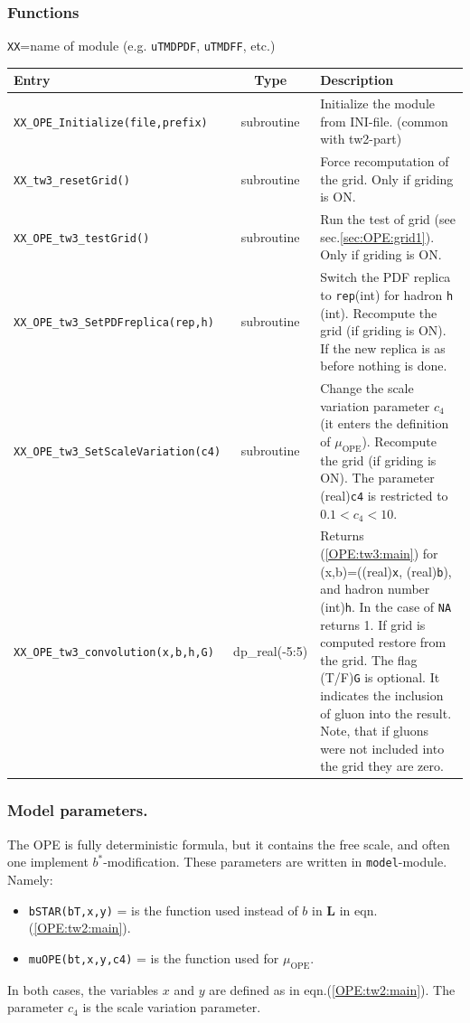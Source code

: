 \documentclass[prd,nofootinbib,eqsecnum,final]{revtex4}
\renewcommand{\(}{\left(}
\renewcommand{\)}{\right)}
\renewcommand{\[}{\left[}
\renewcommand{\]}{\right]}
\begin{document}
\subsubsection{Functions}

\begin{center}
\texttt{XX}=name of module (e.g. \texttt{uTMDPDF}, \texttt{uTMDFF}, etc.)
\\
\begin{tabular}{||p{5.5cm}||c||p{8.5cm}||}
\hline\hline
Entry &~~Type~~& Description
\\\hline
\texttt{XX\_OPE\_Initialize(file,prefix)} & subroutine & Initialize the module from INI-file. (common with tw2-part)
\\\hline
\texttt{XX\_tw3\_resetGrid()} & subroutine & Force recomputation of the grid. Only if griding is ON.
\\\hline
\texttt{XX\_OPE\_tw3\_testGrid()} & subroutine & Run the test of grid (see sec.\ref{sec:OPE:grid1}).  Only if griding is ON.
\\\hline
\texttt{XX\_OPE\_tw3\_SetPDFreplica(rep,h)} & subroutine & Switch the PDF replica to \texttt{rep}(int) for hadron \texttt{h} (int). Recompute the grid (if griding is ON). If the new replica is as before nothing is done.
\\\hline
\texttt{XX\_OPE\_tw3\_SetScaleVariation(c4)} & subroutine & Change the scale variation parameter $c_4$ (it enters the definition of $\mu_{\text{OPE}}$). Recompute the grid (if griding is ON). The parameter (real)\texttt{c4} is restricted to $0.1<c_4<10$.
\\\hline\hline
\texttt{XX\_OPE\_tw3\_convolution(x,b,h,G)} & dp\_real(-5:5) & Returns (\ref{OPE:tw3:main}) for (x,b)=((real)\texttt{x}, (real)\texttt{b}), and hadron number (int)\texttt{h}. In the case of \texttt{NA} returns 1. If grid is computed restore from the grid. The flag (T/F)\texttt{G} is optional. It indicates the inclusion of gluon into the result. Note, that if gluons were not included into the grid they are zero.
\\\hline\hline
\end{tabular}
\end{center}

\subsubsection{Model parameters.} 

The OPE is fully deterministic formula, but it contains the free scale, and often one implement $b^*$-modification. These parameters are written in \texttt{model}-module. Namely:
\begin{itemize}
\item \texttt{bSTAR(bT,x,y)} = is the function used instead of $b$ in  $\mathbf{L}$ in eqn.(\ref{OPE:tw2:main}).
\item \texttt{muOPE(bt,x,y,c4)} = is the function used for $\mu_{\text{OPE}}$.
\end{itemize}
In both cases, the variables $x$ and $y$ are defined as in eqn.(\ref{OPE:tw2:main}). The parameter $c_4$ is the scale variation parameter.
\end{document}
